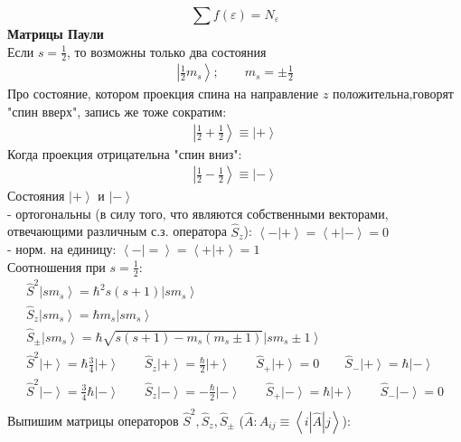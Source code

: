 \documentclass[__minimum__.tex]{subfiles}
\begin{document}
	$$\sum f(\varepsilon) = N_\varepsilon$$
	\textbf{Матрицы Паули}\\
	Если $s = \frac{1}{2}$, то возможны только два состояния
	\begin{gather}
	\left|\frac{1}{2}m_s\right>; \qquad m_s = \pm \frac{1}{2}
	\end{gather}
	Про состояние, котором проекция спина на направление $z$ положительна,говорят "спин вверх", запись же тоже сократим:
	\begin{gather}
	\left|\frac{1}{2}+\frac{1}{2}\right> \equiv \left|+\right>
	\end{gather}
	Когда проекция отрицательна "спин вниз":
	\begin{gather}
	\left|\frac{1}{2}-\frac{1}{2}\right> \equiv \left|-\right>
	\end{gather}
	Состояния $\left|+\right>$ и $\left|-\right>$\\
	- ортогональны (в силу того, что являются собственными векторами, отвечающими различным с.з. оператора $\hat{S}_z$): $\left<-|+\right> = \left<+|-\right> = 0$\\
	- норм. на единицу: $\left<-|=\right> = \left<+|+\right> = 1$\\
	Соотношения при $s=\frac{1}{2}$:
	\begin{gather}
	\hat{S}^2 \left|sm_s\right> = \hbar^2 s(s+1)\left|sm_s\right>\\
	\hat{S}_z \left|sm_s\right> = \hbar m_s \left|sm_s\right>\\
	\hat{S}_{\pm} \left|sm_s\right> = \hbar \sqrt{s(s+1)-m_s(m_s \pm 1)}\left|sm_s\pm 1\right>\\
	\hat{S}^2 \left|+\right> = \hbar \frac{3}{4} \left|+\right> \qquad \hat{S}_z\left|+\right>=\frac{\hbar}{2}\left|+\right> \qquad \hat{S}_+ \left|+\right> =0 \qquad \hat{S}_- \left|+\right> = \hbar \left|-\right>\\
	\hat{S}^2 \left|-\right> = \frac{3}{4}\hbar \left|-\right> \qquad \hat{S}_z \left|-\right> = -\frac{\hbar}{2}\left|-\right> \qquad \hat{S}_+ \left|-\right> = \hbar \left|+\right> \qquad \hat{S}_- \left|-\right> = 0\\
	\end{gather}
	Выпишим матрицы операторов $\hat{S}^2,\hat{S}_z,\hat{S}_{\pm}$ ($\hat{A}: A_{ij} \equiv \left<i|\hat{A}|j\right>$):
\end{document}
